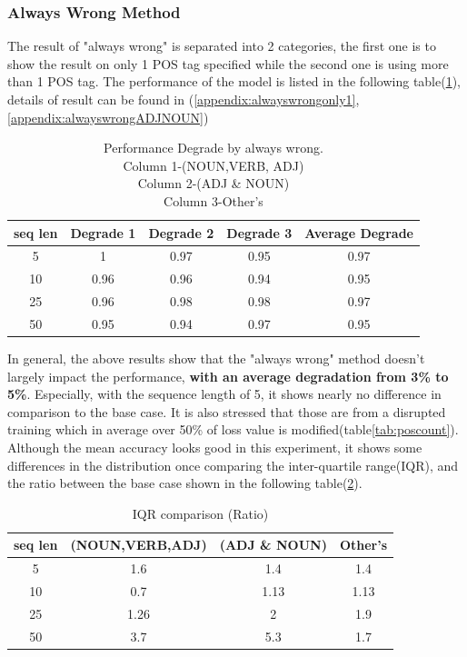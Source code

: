 \documentclass[12pt]{article}
\begin{document}
\subsubsection{Always Wrong Method}
The result of "always wrong" is separated into 2 categories, the first one is to show the result on only 1 POS tag specified while the second one is using more than 1 POS tag. The performance of the model is listed in the following table(\ref{tab:alwayswrongDegrade}), details of result can be found in (\ref{appendix:alwayswrongonly1},\ref{appendix:alwayswrongADJNOUN})  

\begin{table}[!h]
\fontsize{10pt}{10pt}\selectfont
\begin{tabular}{|c|c|c|c|c|}
\hline
seq len & Degrade 1 & Degrade 2 & Degrade 3 & Average Degrade \\ \hline
5       & 1         & 0.97      & 0.95     & 0.97 \\ \hline
10      & 0.96      & 0.96      & 0.94     & 0.95 \\ \hline
25      & 0.96      & 0.98      & 0.98     & 0.97  \\ \hline
50      & 0.95      & 0.94      & 0.97     & 0.95 \\ \hline
\end{tabular}
\caption{Performance Degrade by always wrong. \\
Column 1-(NOUN,VERB, ADJ)\\ 
Column 2-(ADJ \& NOUN)\\
Column 3-Other's}
\label{tab:alwayswrongDegrade}
\end{table}

In general, the above results show that the "always wrong" method doesn't largely impact the performance, \textbf{with an average degradation from 3\% to 5\%}. Especially, with the sequence length of 5, it shows nearly no difference in comparison to the base case. It is also stressed that those are from a disrupted training which in average over 50\% of loss value is modified(table\ref{tab:poscount}). Although the mean accuracy looks good in this experiment, it shows some differences in the distribution once comparing the inter-quartile range(IQR), and the ratio between the base case shown in the following table(\ref{tab:alwayswrongIQR}).   
\begin{table}[!h]
\fontsize{10pt}{10pt}\selectfont
\begin{center}
\begin{tabular}{|c|c|c|c|}
\hline
seq len & (NOUN,VERB,ADJ) & (ADJ \& NOUN) & Other's \\ \hline
5       & 1.6             & 1.4         & 1.4    \\ \hline
10      & 0.7             & 1.13         & 1.13    \\ \hline
25      & 1.26            & 2            & 1.9     \\ \hline
50      & 3.7             & 5.3          & 1.7     \\ \hline
\end{tabular}
\caption{IQR comparison (Ratio) }
\label{tab:alwayswrongIQR}
\end{center}
\end{table}
\end{document}
